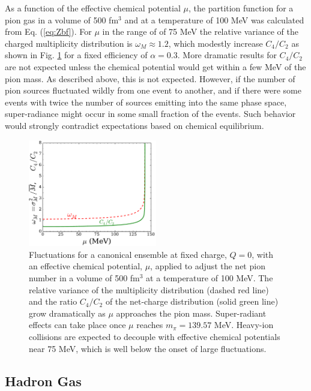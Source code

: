 \documentclass[aps,prc,nofootinbib,showpacs,superscriptaddress,groupedaddress]{revtex4-1}
\begin{document}
As a function of the effective chemical potential $\mu$, the partition function for a pion gas in a volume of 500 fm$^3$ and at a temperature of 100 MeV was calculated from Eq. (\ref{eq:Zbf}). For $\mu$ in the range of of 75 MeV the relative variance of the charged multiplicity distribution is $\omega_M\approx 1.2$, which modestly increase $C_4/C_2$ as shown in Fig. \ref{fig:cheapbose} for a fixed efficiency of $\alpha=0.3$. More dramatic results for $C_4/C_2$ are not expected unless the chemical potential would get within a few MeV of the pion mass. As described above, this is not expected. However, if the number of pion sources fluctuated wildly from one event to another, and if there were some events with twice the number of sources emitting into the same phase space, super-radiance might occur in some small fraction of the events. Such behavior would strongly contradict expectations based on chemical equilibrium. 
\begin{figure}
\centerline{\includegraphics[width=0.5\textwidth]{figs/C4_bose}}
\caption{\label{fig:cheapbose}
Fluctuations for a canonical ensemble at fixed charge, $Q=0$, with an effective chemical potential, $\mu$, applied to adjust the net pion number in a volume of 500 fm$^3$ at a temperature of 100 MeV. The relative variance of the multiplicity distribution (dashed red line) and the ratio $C_4/C_2$ of the net-charge distribution (solid green line) grow dramatically as $\mu$ approaches the pion mass. Super-radiant effects can take place once $\mu$ reaches $m_\pi=139.57$ MeV. Heavy-ion collisions are expected to decouple with effective chemical potentials near 75 MeV, which is well below the onset of large fluctuations.
}
\end{figure}

\subsection{Hadron Gas}\label{sec:hadrongas_cheap}
\end{document}
